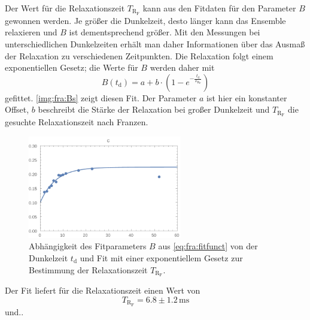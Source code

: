 Der Wert für die Relaxationszeit $T_{\text{R}_\text{F}}$ kann aus den Fitdaten für den Parameter $B$ gewonnen werden.
Je größer die Dunkelzeit, desto länger kann das Ensemble relaxieren und $B$ ist dementsprechend größer.
Mit den Messungen bei unterschiedlichen Dunkelzeiten erhält
man daher Informationen über das Ausmaß der Relaxation zu
verschiedenen Zeitpunkten.
Die Relaxation folgt einem exponentiellen Gesetz; die Werte für $B$ werden daher mit
\begin{equation}
  B(t_\text{d})= a + b \cdot \left(1 - e^{-\frac{t_\text{d}}{T_{\text{R}_\text{F}}}}\right)
\end{equation}
gefittet.
\autoref{img:fra:Bs} zeigt diesen Fit. Der Parameter $a$ ist hier ein konstanter Offset,
$b$ beschreibt die Stärke der Relaxation bei großer Dunkelzeit und
$T_{\text{R}_\text{F}}$ die gesuchte Relaxationszeit nach Franzen.

\begin{figure}[H]
\begin{center}
  \includegraphics[width=0.6\textwidth]{../img/part6/Bs.pdf}
  \caption{Abhängigkeit des Fitparameters $B$ aus \autoref{eq:fra:fitfunct} von der Dunkelzeit $t_\text{d}$ und Fit
  mit einer exponentiellem Gesetz zur Bestimmung der Relaxationszeit $T_{\text{R}_\text{F}}$.}
  \label{img:fra:Bs}
\end{center}
\end{figure}

Der Fit liefert für die Relaxationszeit einen Wert von
\begin{equation}
  T_{\text{R}_\text{F}} = 6.8 \pm 1.2 \,\text{ms}
\end{equation}
und..

